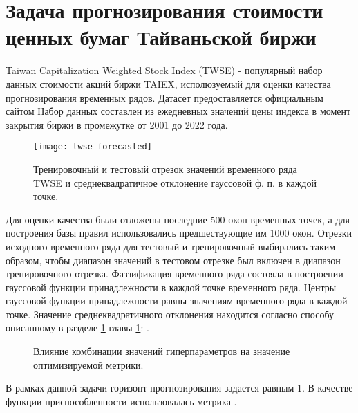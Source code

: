\section{Задача прогнозирования стоимости ценных бумаг Тайваньской биржи}

\cite{Sadaei2016}

Taiwan Capitalization Weighted Stock Index (TWSE) - популярный набор данных стоимости акций биржи TAIEX, исполюзуемый для оценки качества прогнозирования временных рядов. Датасет предоставляется официальным сайтом  Набор данных составлен из ежедневных значений цены индекса в момент закрытия биржи в промежутке от 2001 до 2022 года.

\begin{figure}[hbt] 	
	\label{fig:twse-ns-fuzzification}
	\centering
	\texttt{[image: twse-forecasted]}
	\caption{Тренировочный и тестовый отрезок значений временного ряда TWSE и среднеквадратичное отклонение гауссовой ф. п. в каждой точке.}
\end{figure}

 Для оценки качества были отложены последние 500 окон временных точек, а для построения базы правил использовались предшествующие им 1000 окон. Отрезки исходного временного ряда для тестовый и тренировочный выбирались таким образом, чтобы диапазон значений в тестовом отрезке был включен в диапазон тренировочного отрезка. Фаззификация временного ряда состояла в построении гауссовой функции принадлежности в каждой точке временного ряда. Центры гауссовой функции принадлежности равны значениям временного ряда в каждой точке. Значение среднеквадратичного отклонения находится согласно способу описанному в разделе \ref{} главы \ref{}: .
 
 \begin{figure}[hbt] 	
 	\label{fig:twse-optuna-parallel-score}
 	\centering
 	\caption{Влияние комбинации значений гиперпараметров на значение оптимизируемой метрики.}
 \end{figure}
 
В рамках данной задачи горизонт прогнозирования задается равным 1. В качестве функции приспособленности использовалась метрика .


